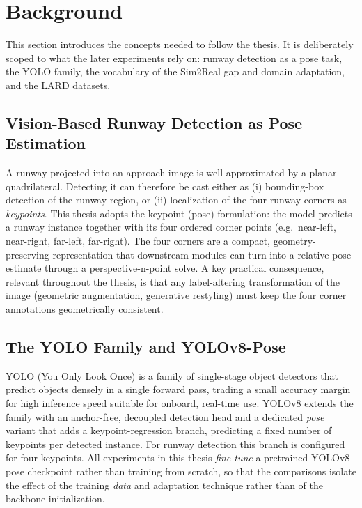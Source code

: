 \section{Background}
\label{sec:background}

This section introduces the concepts needed to follow the thesis. It is deliberately
scoped to what the later experiments rely on: runway detection as a pose task,
the YOLO family, the vocabulary of the Sim2Real gap and domain adaptation, and the
LARD datasets.

\subsection{Vision-Based Runway Detection as Pose Estimation}
\label{subsec:bg-runway}
A runway projected into an approach image is well approximated by a planar
quadrilateral. Detecting it can therefore be cast either as (i) bounding-box
detection of the runway region, or (ii) localization of the four runway corners as
\emph{keypoints}. This thesis adopts the keypoint (pose) formulation: the model
predicts a runway instance together with its four ordered corner points
(e.g.\ near-left, near-right, far-left, far-right). The four corners are a compact,
geometry-preserving representation that downstream modules can turn into a relative
pose estimate through a perspective-n-point solve. A key practical consequence,
relevant throughout the thesis, is that any label-altering transformation of the
image (geometric augmentation, generative restyling) must keep the four corner
annotations geometrically consistent.

\subsection{The YOLO Family and YOLOv8-Pose}
\label{subsec:bg-yolo}
\ac{YOLO} (You Only Look Once) is a family of single-stage object detectors that
predict objects densely in a single forward pass, trading a small accuracy margin
for high inference speed suitable for onboard, real-time use. YOLOv8 extends the
family with an anchor-free, decoupled detection head and a dedicated
\emph{pose} variant that adds a keypoint-regression branch, predicting a fixed number
of keypoints per detected instance. For runway detection this branch is configured
for four keypoints. All experiments in this thesis \emph{fine-tune} a
pretrained YOLOv8-pose checkpoint rather than training from scratch, so that the
comparisons isolate the effect of the training \emph{data} and adaptation
technique rather than of the backbone initialization.

